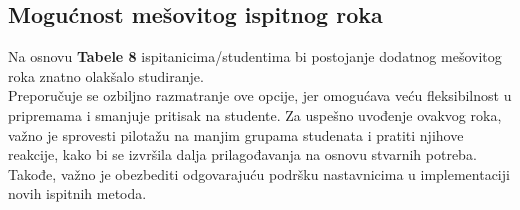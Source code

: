 \documentclass[a4paper]{article}
\begin{document}
\vspace{0.5cm}  %

\begin{table}[H]
\centering %
\end{table}



\subsection{\textbf{Mogućnost mešovitog ispitnog roka} }

Na osnovu \textbf{Tabele 8} ispitanicima/studentima bi postojanje dodatnog mešovitog roka znatno olakšalo studiranje.\\

Preporučuje se ozbiljno razmatranje ove opcije, jer omogućava veću fleksibilnost u pripremama i smanjuje pritisak na studente. Za uspešno uvođenje ovakvog roka, važno je sprovesti pilotažu na manjim grupama studenata i pratiti njihove reakcije, kako bi se izvršila dalja prilagođavanja na osnovu stvarnih potreba. Takođe, važno je obezbediti odgovarajuću podršku nastavnicima u implementaciji novih ispitnih metoda.\\

\begin{table}[H]
\centering
\caption{Mogućnost mešovitog ispitnog roka}
\end{table}
\end{document}

